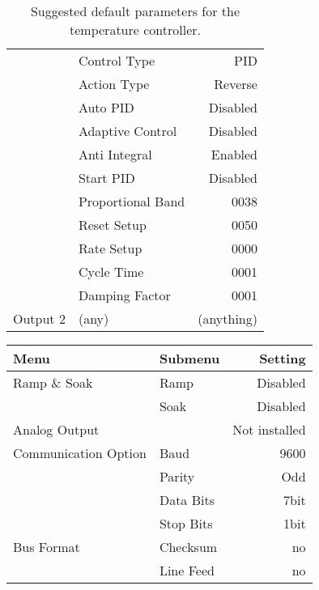 {\begin{table}
\begin{center}
\begin{tabular}{|l|l|r|}
                    & Control Type           & PID \\
                    & Action Type            & Reverse \\
                    & Auto PID               & Disabled \\
                    & Adaptive Control       & Disabled \\
                    & Anti Integral          & Enabled  \\
                    & Start PID              & Disabled \\
                    & Proportional Band      & 0038 \\
                    & Reset Setup            & 0050 \\
                    & Rate Setup             & 0000 \\
                    & Cycle Time             & 0001 \\
                    & Damping Factor         & 0001 \\
\hline
Output 2            & (any)                  & (anything) \\
\hline
\end{tabular}
\end{center}
\caption{Suggested default parameters for the temperature controller.}
\label{tab:ctlparam1}
\end{table}
\begin{table}
\begin{center}
\begin{tabular}{|l|l|r|}
\hline
Menu & Submenu & Setting \\
\hline
Ramp \& Soak        & Ramp                   & Disabled \\
                    & Soak                   & Disabled \\
\hline
Analog Output         &                      & Not installed \\
\hline
Communication Option  & Baud                 & 9600 \\
                      & Parity               & Odd  \\
                      & Data Bits            & 7bit \\
                      & Stop Bits            & 1bit \\
\hline
Bus Format            & Checksum             & no  \\
                      & Line Feed            & no   \\

\end{tabular}
\end{center}
\end{table}}
